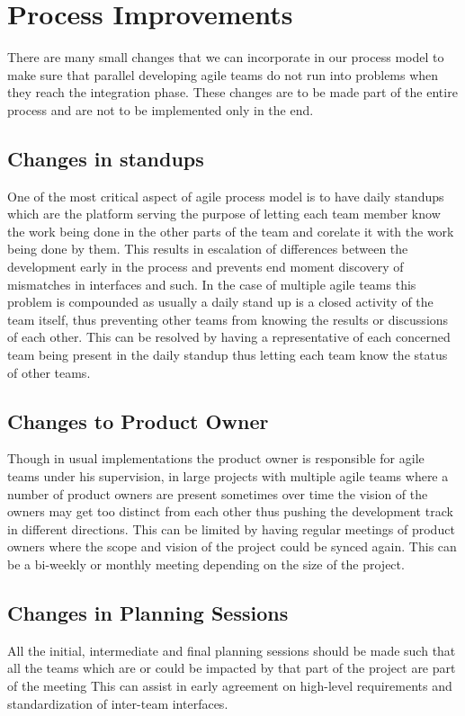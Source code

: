 \section{Process Improvements} 
\label{sec:proc_impv}
	There are many small changes \cite{collabAcrossAgile_article} that we can incorporate in our process model to make sure that parallel developing agile teams do not run into problems when they reach the integration phase.
	These changes are to be made part of the entire process and are not to be implemented only in the end.

\subsection{Changes in standups}
	One of the most critical aspect of agile process model is to have daily standups which are the platform serving the purpose of letting each team member know the work being done in the other parts of the team and corelate it with the work being done by them.
	This results in escalation of differences between the development early in the process and prevents end moment discovery of mismatches in interfaces and such.
	In the case of multiple agile teams this problem is compounded as usually a daily stand up is a closed activity of the team itself, thus preventing other teams from knowing the results or discussions of each other.
	This can be resolved by having a representative of each concerned team being present in the daily standup thus letting each team know the status of other teams.

\subsection{Changes to Product Owner}
	Though in usual implementations the product owner is responsible for agile teams under his supervision, in large projects with multiple agile teams where a number of product owners are present sometimes over time the vision of the owners may get too distinct from each other thus pushing the development track in different directions.
	This can be limited by having regular meetings of product owners where the scope and vision of the project could be synced again. This can be a bi-weekly or monthly meeting depending on the size of the project.

\subsection{Changes in Planning Sessions}
	All the initial, intermediate and final planning sessions should be made such that all the teams which are or could be impacted by that part of the project are part of the meeting This can assist in early agreement on high-level requirements and standardization of inter-team interfaces.

